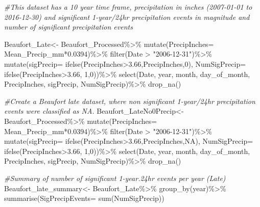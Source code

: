 \documentclass[
  12pt,
]{article}
\newenvironment{Shaded}{\begin{snugshade}}{\end{snugshade}}
\newcommand{\AttributeTok}[1]{\textcolor[rgb]{0.77,0.63,0.00}{#1}}
\newcommand{\CommentTok}[1]{\textcolor[rgb]{0.56,0.35,0.01}{\textit{#1}}}
\newcommand{\ConstantTok}[1]{\textcolor[rgb]{0.00,0.00,0.00}{#1}}
\newcommand{\DecValTok}[1]{\textcolor[rgb]{0.00,0.00,0.81}{#1}}
\newcommand{\FloatTok}[1]{\textcolor[rgb]{0.00,0.00,0.81}{#1}}
\newcommand{\FunctionTok}[1]{\textcolor[rgb]{0.00,0.00,0.00}{#1}}
\newcommand{\NormalTok}[1]{#1}
\newcommand{\OtherTok}[1]{\textcolor[rgb]{0.56,0.35,0.01}{#1}}
\newcommand{\SpecialCharTok}[1]{\textcolor[rgb]{0.00,0.00,0.00}{#1}}
\newcommand{\StringTok}[1]{\textcolor[rgb]{0.31,0.60,0.02}{#1}}
\begin{document}
\begin{Shaded}
\begin{Highlighting}[]
\CommentTok{\#This dataset has a 10 year time frame, precipitation in inches (2007{-}01{-}01 to 2016{-}12{-}30) and significant 1{-}year/24hr precipitation events in magnitude and number of significant precipitation events}

\NormalTok{Beaufort\_Late}\OtherTok{\textless{}{-}}\NormalTok{ Beaufort\_Processed}\SpecialCharTok{\%\textgreater{}\%}
  \FunctionTok{mutate}\NormalTok{(}\AttributeTok{PrecipInches=}\NormalTok{ Mean\_Precip\_mm}\SpecialCharTok{*}\FloatTok{0.0394}\NormalTok{)}\SpecialCharTok{\%\textgreater{}\%}
  \FunctionTok{filter}\NormalTok{(Date }\SpecialCharTok{\textgreater{}} \StringTok{"2006{-}12{-}31"}\NormalTok{)}\SpecialCharTok{\%\textgreater{}\%}
  \FunctionTok{mutate}\NormalTok{(}\AttributeTok{sigPrecip=} \FunctionTok{ifelse}\NormalTok{(PrecipInches}\SpecialCharTok{\textgreater{}}\FloatTok{3.66}\NormalTok{,PrecipInches,}\DecValTok{0}\NormalTok{),}
         \AttributeTok{NumSigPrecip=} \FunctionTok{ifelse}\NormalTok{(PrecipInches}\SpecialCharTok{\textgreater{}}\FloatTok{3.66}\NormalTok{, }\DecValTok{1}\NormalTok{,}\DecValTok{0}\NormalTok{))}\SpecialCharTok{\%\textgreater{}\%}
  \FunctionTok{select}\NormalTok{(Date, year, month, }
\NormalTok{         day\_of\_month, PrecipInches, sigPrecip, NumSigPrecip)}\SpecialCharTok{\%\textgreater{}\%}
  \FunctionTok{drop\_na}\NormalTok{()}

\CommentTok{\#Create a Beaufort late dataset, where non significant 1{-}year/24hr precipitation events were classified as NA.}
\NormalTok{Beaufort\_LateNo0Precip}\OtherTok{\textless{}{-}}\NormalTok{ Beaufort\_Processed}\SpecialCharTok{\%\textgreater{}\%}
  \FunctionTok{mutate}\NormalTok{(}\AttributeTok{PrecipInches=}\NormalTok{ Mean\_Precip\_mm}\SpecialCharTok{*}\FloatTok{0.0394}\NormalTok{)}\SpecialCharTok{\%\textgreater{}\%}
  \FunctionTok{filter}\NormalTok{(Date }\SpecialCharTok{\textgreater{}} \StringTok{"2006{-}12{-}31"}\NormalTok{)}\SpecialCharTok{\%\textgreater{}\%}
  \FunctionTok{mutate}\NormalTok{(}\AttributeTok{sigPrecip=} \FunctionTok{ifelse}\NormalTok{(PrecipInches}\SpecialCharTok{\textgreater{}}\FloatTok{3.66}\NormalTok{,PrecipInches,}\ConstantTok{NA}\NormalTok{),}
         \AttributeTok{NumSigPrecip=} \FunctionTok{ifelse}\NormalTok{(PrecipInches}\SpecialCharTok{\textgreater{}}\FloatTok{3.66}\NormalTok{, }\DecValTok{1}\NormalTok{,}\DecValTok{0}\NormalTok{))}\SpecialCharTok{\%\textgreater{}\%}
  \FunctionTok{select}\NormalTok{(Date, year, month, }
\NormalTok{         day\_of\_month, PrecipInches, sigPrecip, NumSigPrecip)}\SpecialCharTok{\%\textgreater{}\%}
  \FunctionTok{drop\_na}\NormalTok{()}

\CommentTok{\#Summary of number of significant 1{-}year.24hr events per year (Late)}
\NormalTok{Beaufort\_late\_summary}\OtherTok{\textless{}{-}}\NormalTok{ Beaufort\_Late}\SpecialCharTok{\%\textgreater{}\%}
  \FunctionTok{group\_by}\NormalTok{(year)}\SpecialCharTok{\%\textgreater{}\%}
  \FunctionTok{summarise}\NormalTok{(}\AttributeTok{SigPrecipEvents=} \FunctionTok{sum}\NormalTok{(NumSigPrecip))}
\end{Highlighting}
\end{Shaded}
\end{document}
